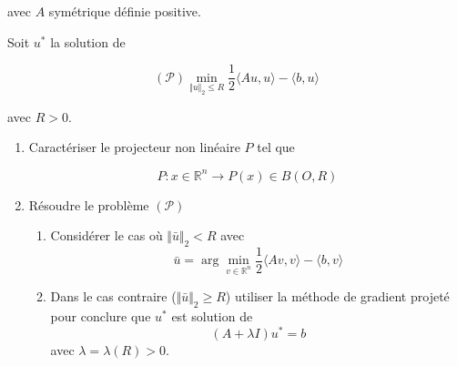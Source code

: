 \documentclass[11pt, a4paper]{article}
\begin{document}
avec $A$ symétrique définie positive.

Soit $u^*$ la solution de 

$$ (\mathcal{P}) \displaystyle \min_{\Vert u\Vert_2 \leq R} \frac{1}{2} \langle Au,u \rangle - \langle b,u \rangle$$

avec $R>0$.

\begin{enumerate}
\item Caractériser le projecteur non linéaire $P$ tel que

$$ P: x \in \mathbb{R}^n \rightarrow P(x) \in B(O,R)$$

\item Résoudre le problème $(\mathcal{P})$
\begin{enumerate}
\item Considérer le cas où $\Vert \bar{u}\Vert_2 < R$ avec 
$$ \displaystyle \bar{u} = \arg\min_{v\in \mathbb{R}^n} \frac{1}{2} \langle Av,v \rangle  - \langle b,v \rangle $$

\item Dans le cas contraire ($\Vert \bar{u}\Vert_2 \geq R$) utiliser la méthode de gradient projeté pour conclure que $u^*$ est solution de 
$$ (A + \lambda I)u^* = b$$ avec $\lambda = \lambda (R) > 0$.
\end{enumerate}
\end{enumerate}

\end{document}
